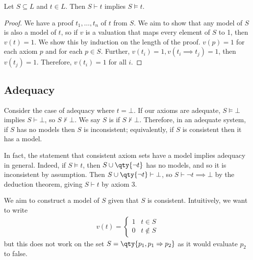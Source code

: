 \begin{proposition}
    Let $S \subseteq L$ and $t \in L$.
    Then $S \vdash t$ implies $S \models t$.
\end{proposition}

\begin{proof}
    We have a proof $t_1, \dots, t_n$ of $t$ from $S$.
    We aim to show that any model of $S$ is also a model of $t$, so if $v$ is a valuation that maps every element of $S$ to 1, then $v(t) = 1$.
    We show this by induction on the length of the proof.
    $v(p) = 1$ for each axiom $p$ and for each $p \in S$.
    Further, $v(t_i) = 1, v(t_i \implies t_j) = 1$, then $v(t_j) = 1$.
    Therefore, $v(t_i) = 1$ for all $i$.
\end{proof}

\subsection{Adequacy}
Consider the case of adequacy where $t = \bot$.
If our axioms are adequate, $S \models \bot$ implies $S \vdash \bot$, so $S \not\vdash \bot$.
We say $S$ is  if $S \not\vdash \bot$.
Therefore, in an adequate system, if $S$ has no models then $S$ is inconsistent; equivalently, if $S$ is consistent then it has a model.

In fact, the statement that consistent axiom sets have a model implies adequacy in general.
Indeed, if $S \models t$, then $S \cup \qty{\neg t}$ has no models, and so it is inconsistent by assumption.
Then $S \cup \qty{\neg t} \vdash \bot$, so $S \vdash \neg t \implies \bot$ by the deduction theorem, giving $S \vdash t$ by axiom 3.

We aim to construct a model of $S$ given that $S$ is consistent.
Intuitively, we want to write
\begin{align*}
v(t) = \begin{cases}
    1 & t \in S \\
    0 & t \not\in S
\end{cases}
\end{align*}
but this does not work on the set $S = \qty{p_1, p_1 \implies p_2}$ as it would evaluate $p_2$ to false.

